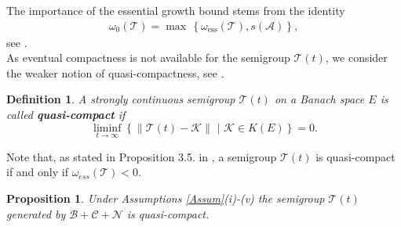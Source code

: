 \documentclass[12pt,a4paper]{amsart}
\newtheorem{proposition}[theorem]{Proposition}
\newtheorem{definition}[theorem]{Definition}
\newcommand{\norma}[1]{{\left \|#1\right \|}}
\begin{document}
The importance of the essential growth bound stems from the identity
\begin{align}
    \label{alternative_characterisation_w_0}
	\omega_0\left({\mathcal T}\right)= \max\,\left\{\omega_\text{ess}\left({\mathcal T}\right), s\left({\mathcal A}\right)\right\},
\end{align}
see \cite[Cor. 2.11, Ch. IV]{EngelNagel}.
\\
As eventual compactness is not available for the semigroup $\mathcal{T}(t)$, we consider the weaker notion of quasi-compactness, see \cite{EngelNagel}.
\begin{definition}
A strongly continuous semigroup $\mathcal{T}(t)$ on a Banach space $E$ is called \textbf{quasi-compact} if
\begin{equation*}
\liminf_{t\to\infty} \left\{\norma{\mathcal{T}(t)-\mathcal{K}}\,\,\vert\,\, \mathcal{K}\in K(E)\right\}=0.
\end{equation*}
\end{definition}
\noindent Note that, as stated in Proposition 3.5. in \cite[Ch.V]{EngelNagel}, a semigroup $\mathcal{T}(t)$ is quasi-compact if and only if $\omega_{ess}(\mathcal{T})<0$. 
\begin{proposition}\label{quasi-compact}
Under Assumptions \ref{Assum}(i)-(v) the semigroup $\mathcal{T}(t)$ generated by $\mathcal{B}+\mathcal{C}+\mathcal{N}$ is quasi-compact.
\end{proposition}
\end{document}
